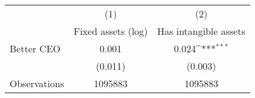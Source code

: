 {
\def\sym#1{\ifmmode^{#1}\else\(^{#1}\)\fi}
\begin{tabular}{l*{2}{c}}
\hline\hline
                    &\multicolumn{1}{c}{(1)}&\multicolumn{1}{c}{(2)}\\
                    &\multicolumn{1}{c}{Fixed assets (log)}&\multicolumn{1}{c}{Has intangible assets}\\
\hline
Better CEO          &       0.001         &       0.024\sym{***}\\
                    &     (0.011)         &     (0.003)         \\
\hline
Observations        &     1095883         &     1095883         \\
\hline\hline
\end{tabular}
}
